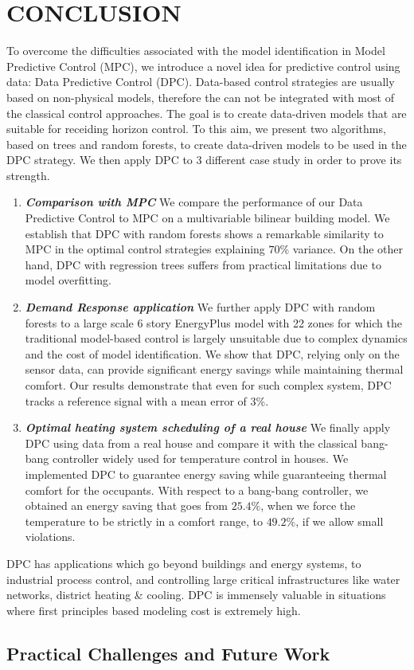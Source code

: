 \section{CONCLUSION}
\label{S:conclusion}

To overcome the difficulties associated with the model identification in Model Predictive Control (MPC), we introduce a novel idea for predictive control using data: Data Predictive Control (DPC). Data-based control strategies are usually based on non-physical models, therefore the can not be integrated with most of the classical control approaches. The goal is to create data-driven models that are suitable for receiding horizon control. To this aim, we present two algorithms, based on trees and random forests, to create data-driven models to be used in the DPC strategy. We then apply DPC to $3$ different case study in order to prove its strength.
\begin{enumerate}
\item \emph{\textbf{Comparison with MPC}} We compare the performance of our Data Predictive Control to MPC on a multivariable bilinear building model. We establish that DPC with random forests shows a remarkable similarity to MPC in the optimal control strategies explaining $70\%$ variance. On the other hand, DPC with regression trees suffers from practical limitations due to model overfitting.
\item \emph{\textbf{Demand Response application}} We further apply DPC with random forests to a large scale 6 story EnergyPlus model with 22 zones for which the traditional model-based control is largely unsuitable due to complex dynamics and the cost of model identification. We show that DPC, relying only on the sensor data, can provide significant energy savings while maintaining thermal comfort. Our results demonstrate that even for such complex system, DPC tracks a reference signal with a mean error of $3\%$.
\item \emph{\textbf{Optimal heating system scheduling of a real house}} We finally apply DPC using data from a real house and compare it with the classical bang-bang controller widely used for temperature control in houses. We implemented DPC to guarantee energy saving while guaranteeing thermal comfort for the occupants. With respect to a bang-bang controller, we obtained an energy saving that goes from $25.4\%$, when we force the temperature to be strictly in a comfort range, to $49.2\%$, if we allow small violations.
\end{enumerate}

DPC has applications which go beyond buildings and energy systems, to industrial process control, and controlling large critical infrastructures like water networks, district heating \& cooling. DPC is immensely valuable in situations where first principles based modeling cost is extremely high.

\subsection{Practical Challenges and Future Work}
\label{SS:challenges}
